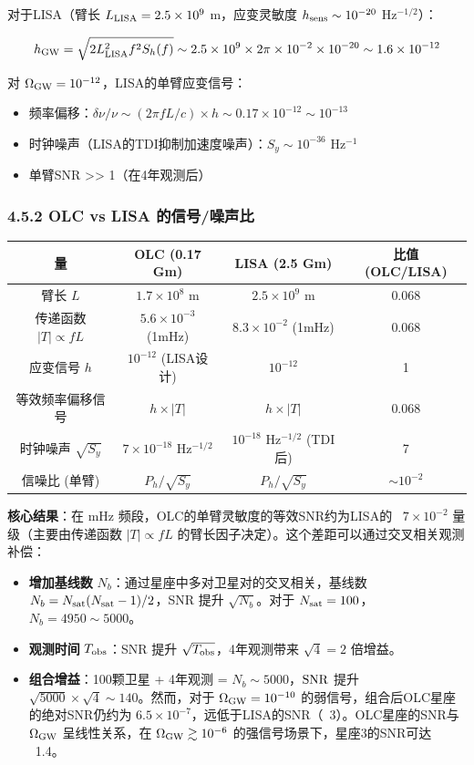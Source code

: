 \documentclass[12pt,a4paper]{article}
\begin{document}
对于LISA（臂长 $L_{\rm LISA} = 2.5 \times 10^9$ m，应变灵敏度 $h_{\rm sens} \sim 10^{-20}$ Hz$^{-1/2}$）：

$$h_{\rm GW} = \sqrt{2 L_{\rm LISA}^2 f^2 S_h(f)} \sim 2.5 \times 10^9 \times 2\pi \times 10^{-2} \times 10^{-20} \sim 1.6 \times 10^{-12}$$

对 $\Omega_{\rm GW} = 10^{-12}$，LISA的单臂应变信号：
\begin{itemize}
  \item 频率偏移：$\delta\nu/\nu \sim (2\pi f L/c) \times h \sim 0.17 \times 10^{-12} \sim 10^{-13}$
  \item 时钟噪声（LISA的TDI抑制加速度噪声）：$S_y \sim 10^{-36}$ Hz$^{-1}$
  \item 单臂SNR >> 1（在4年观测后）

\end{itemize}
\subsubsection{4.5.2 OLC vs LISA 的信号/噪声比}


\begin{tabular}{|c|c|c|c|}
\hline
量 & OLC (0.17 Gm) & LISA (2.5 Gm) & 比值 (OLC/LISA) \\
\hline
臂长 $L$ & $1.7 \times 10^8$ m & $2.5 \times 10^9$ m & 0.068 \\
传递函数 $|T| \propto fL$ & $5.6 \times 10^{-3}$ (1mHz) & $8.3 \times 10^{-2}$ (1mHz) & 0.068 \\
应变信号 $h$ & $10^{-12}$ (LISA设计) & $10^{-12}$ & 1 \\
等效频率偏移信号 & $h \times |T|$ & $h \times |T|$ & 0.068 \\
时钟噪声 $\sqrt{S_y}$ & $7 \times 10^{-18}$ Hz$^{-1/2}$ & $10^{-18}$ Hz$^{-1/2}$ (TDI后) & 7 \\
信噪比 (单臂) & $P_h/\sqrt{S_y}$ & $P_h/\sqrt{S_y}$ & $\sim 10^{-2}$ \\
\hline
\end{tabular}


\textbf{核心结果}：在 mHz 频段，OLC的单臂灵敏度的等效SNR约为LISA的 ~$7\times 10^{-2}$ 量级（主要由传递函数 $|T| \propto fL$ 的臂长因子决定）。这个差距可以通过交叉相关观测补偿：
\begin{itemize}
  \item[1] \textbf{增加基线数} $N_b$：通过星座中多对卫星对的交叉相关，基线数 $N_b = N_{\rm sat}(N_{\rm sat}-1)/2$，SNR 提升 $\sqrt{N_b}$。对于 $N_{\rm sat} = 100$，$N_b = 4950 \sim 5000$。
  \item[2] \textbf{观测时间} $T_{\rm obs}$：SNR 提升 $\sqrt{T_{\rm obs}}$，4年观测带来 $\sqrt{4} = 2$ 倍增益。
  \item[3] \textbf{组合增益}：100颗卫星 + 4年观测 = $N_b \sim 5000$，${\rm SNR}$ 提升 $\sqrt{5000} \times \sqrt{4} \sim 140$。然而，对于 $\Omega_{\rm GW} = 10^{-10}$ 的弱信号，组合后OLC星座的绝对SNR仍约为 $6.5\times 10^{-7}$，远低于LISA的SNR（~3）。OLC星座的SNR与 $\Omega_{\rm GW}$ 呈线性关系，在 $\Omega_{\rm GW} \gtrsim 10^{-6}$ 的强信号场景下，星座3的SNR可达 ~1.4。

\end{itemize}
\end{document}
